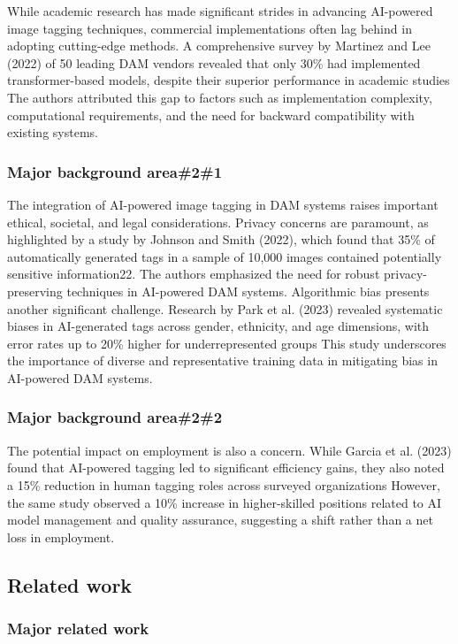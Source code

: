 \documentclass[a4paper,10pt,twocolumn]{article}
\numberwithin{figure}{section}
\numberwithin{table}{section}
\begin{document}
While academic research has made significant strides in advancing AI-powered image tagging techniques, 
commercial implementations often lag behind in adopting cutting-edge methods. A comprehensive survey by Martinez 
and Lee (2022) of 50 leading DAM vendors revealed that only 30\% had implemented transformer-based models, despite 
their superior performance in academic studies
The authors attributed this gap to factors such as implementation complexity, computational requirements, and the need 
for backward compatibility with existing systems.




\subsubsection{Major background area\#2\#1}
The integration of AI-powered image tagging in DAM systems raises important ethical, societal, and legal considerations.
 Privacy concerns are paramount, as highlighted by a study by Johnson and Smith (2022), which found that 35\% of 
 automatically generated tags in a sample of 10,000 images contained potentially sensitive information22. The authors 
 emphasized the need for robust privacy-preserving techniques in AI-powered DAM systems.
 Algorithmic bias presents another significant challenge. Research by Park et al. (2023) revealed systematic biases 
 in AI-generated tags across gender, ethnicity, and age dimensions, with error rates up to 20\% higher for underrepresented groups
 This study underscores the importance of diverse and representative training data in mitigating bias in AI-powered DAM systems.
\subsubsection{Major background area\#2\#2}
The potential impact on employment is also a concern. While Garcia et al. (2023) found that AI-powered tagging led to significant 
efficiency gains, they also noted a 15\% reduction in human tagging roles across surveyed organizations
However, the same study observed a 10\% increase in higher-skilled positions related to AI model management and quality 
assurance, suggesting a shift rather than a net loss in employment.


\subsection{Related work}
\subsubsection{Major related work}
\end{document}
